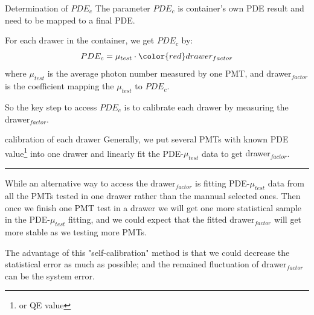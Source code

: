 \documentclass[11pt,compress,xcolor=x11names,UTF8]{beamer}
\begin{document}
\begin{frame}{Determination of $PDE_{c}$}
The parameter $PDE_c$ is container's own PDE result and need to be mapped to a final PDE. 
\vspace{.5cm}

For each drawer in the container, we get $PDE_c$ by:
\begin{equation}
PDE_c=\mu_{test}\cdot {\color{red}drawer_{factor}}
\end{equation}
where $\mu_{test}$ is the average photon number measured by one PMT, and drawer$_{factor}$ is the coefficient mapping the $\mu_{test}$ to $PDE_c$.

\vspace{.5cm}
So the key step to access $PDE_c$ is to calibrate each drawer by measuring the drawer$_{factor}$.
\end{frame}
\begin{frame}{calibration of each drawer}
Generally, we put several PMTs with known PDE value\footnote{or QE value}  into one drawer and linearly fit the PDE-$\mu_{test}$ data to get \alert{drawer$_{factor}$}. 
\vspace{.5cm}
\hrule{\textwidth}
\vspace{.5cm}

While an alternative way to access the drawer$_{factor}$ is fitting PDE-$\mu_{test}$ data {\color{red}from all the PMTs tested in one drawer rather than the mannual selected ones.} Then once we finish one PMT test in a drawer we will get one more statistical sample in the PDE-$\mu_{test}$ fitting, and we could expect that the fitted drawer$_{factor}$ will get more stable as we testing more PMTs.

\vspace{.5cm}
The advantage of this "self-calibration" method is that we could {\color{red}decrease the statistical error as much as possible}; and the remained fluctuation of drawer$_{factor}$ can be the system error. 
\end{frame}
\end{document}
